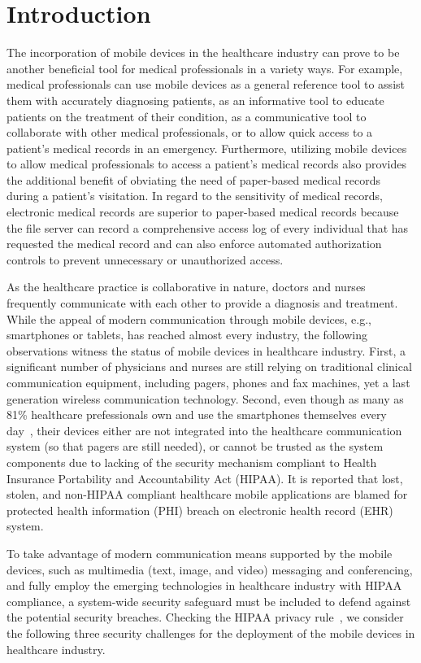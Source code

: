 \section{Introduction}

The incorporation of mobile devices in the healthcare industry
can prove to be another beneficial tool for medical professionals
in a variety ways. For example, medical professionals can use
mobile devices as a general reference tool to assist them with
accurately diagnosing patients, as an informative tool to educate
patients on the treatment of their condition, as a communicative tool
to collaborate with other medical professionals, or to allow
quick access to a patient’s medical records in an emergency.
Furthermore, utilizing mobile devices to allow medical professionals
to access a patient’s medical records also provides the
additional benefit of obviating the need of paper-based medical
records during a patient’s visitation. In regard to the sensitivity
of medical records, electronic medical records are superior
to paper-based medical records because the file server can
record a comprehensive access log of every individual that has
requested the medical record and can also enforce automated
authorization controls to prevent unnecessary or unauthorized
access.

As the healthcare practice is collaborative in nature, doctors
and nurses frequently communicate with each other to provide
a diagnosis and treatment. While the appeal of modern
communication through mobile devices, e.g., smartphones
or tablets, has reached almost every industry, the following
observations witness the status of mobile devices in healthcare
industry. First, a significant number of physicians and nurses
are still relying on traditional clinical communication equipment,
including pagers, phones and fax machines, yet a last
generation wireless communication technology. Second, even
though as many as 81\% healthcare prefessionals own and use
the smartphones themselves every day~\cite{manhattan}, their devices either
are not integrated into the healthcare communication system
(so that pagers are still needed), or cannot be trusted as the
system components due to lacking of the security mechanism
compliant to Health Insurance Portability and Accountability
Act (HIPAA). It is reported \cite{mdnews} that lost, stolen, and non-HIPAA
compliant healthcare mobile applications are blamed
for protected health information (PHI) breach on electronic
health record (EHR) system.

To take advantage of modern communication means supported by the mobile devices,
such as multimedia (text, image, and video) messaging and conferencing, and fully
employ the emerging technologies in healthcare industry with
HIPAA compliance, a system-wide security safeguard must
be included to defend against the potential security breaches.
Checking the HIPAA privacy rule~\cite{hipaarule}, we consider the following
three security challenges for the deployment of the mobile
devices in healthcare industry.

